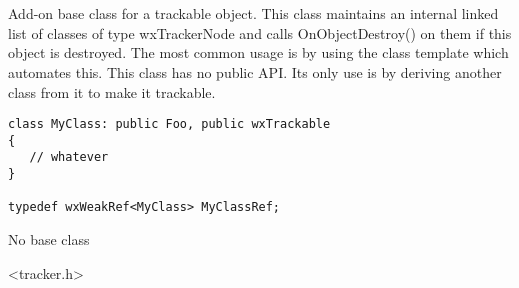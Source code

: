 \section{}\label{wxtrackable}

Add-on base class for a trackable object. This class maintains
an internal linked list of classes of type wxTrackerNode and
calls OnObjectDestroy() on them if this object is destroyed.
The most common usage is by using the 
class template which automates this. This class has no public
API. Its only use is by deriving another class from it to
make it trackable.

\begin{verbatim}
class MyClass: public Foo, public wxTrackable
{
   // whatever
}

typedef wxWeakRef<MyClass> MyClassRef;
\end{verbatim}


No base class


<tracker.h>


